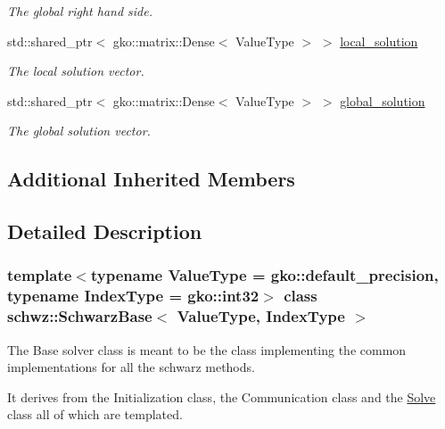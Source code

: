 \begin{DoxyCompactItemize}
\begin{DoxyCompactList}\small\item\em The global right hand side. \end{DoxyCompactList}\item 
\mbox{\label{classschwz_1_1SchwarzBase_a29ef68da307b6de9b8ae878df8fb19d4}} 
std\+::shared\+\_\+ptr$<$ gko\+::matrix\+::\+Dense$<$ Value\+Type $>$ $>$ \hyperlink{classschwz_1_1SchwarzBase_a29ef68da307b6de9b8ae878df8fb19d4}{local\+\_\+solution}
\begin{DoxyCompactList}\small\item\em The local solution vector. \end{DoxyCompactList}\item 
\mbox{\label{classschwz_1_1SchwarzBase_a8e6f088b8a7112af2ce27285d8d91bcc}} 
std\+::shared\+\_\+ptr$<$ gko\+::matrix\+::\+Dense$<$ Value\+Type $>$ $>$ \hyperlink{classschwz_1_1SchwarzBase_a8e6f088b8a7112af2ce27285d8d91bcc}{global\+\_\+solution}
\begin{DoxyCompactList}\small\item\em The global solution vector. \end{DoxyCompactList}\end{DoxyCompactItemize}
\subsection*{Additional Inherited Members}


\subsection{Detailed Description}
\subsubsection*{template$<$typename Value\+Type = gko\+::default\+\_\+precision, typename Index\+Type = gko\+::int32$>$\newline
class schwz\+::\+Schwarz\+Base$<$ Value\+Type, Index\+Type $>$}

The Base solver class is meant to be the class implementing the common implementations for all the schwarz methods. 

It derives from the Initialization class, the Communication class and the \hyperlink{classschwz_1_1Solve}{Solve} class all of which are templated.


